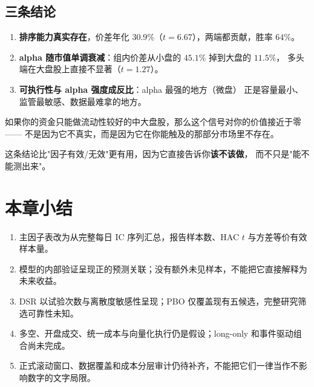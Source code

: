 \subsection{三条结论}

\begin{enumerate}
  \item \textbf{排序能力真实存在}，价差年化 $30.9\%$（$t=6.67$），两端都贡献，胜率 $64\%$。
  \item \textbf{alpha 随市值单调衰减}：组内价差从小盘的 $45.1\%$ 掉到大盘的 $11.5\%$，
        多头端在大盘股上直接不显著（$t=1.27$）。
  \item \textbf{可执行性与 alpha 强度成反比}：alpha 最强的地方（微盘）
        正是容量最小、监管最敏感、数据最难拿的地方。
\end{enumerate}

\begin{keybox}[对个人研究者的含义]
如果你的资金只能做流动性较好的中大盘股，那么这个信号对你的价值接近于零——
不是因为它不真实，而是因为它在你能触及的那部分市场里不存在。

这条结论比"因子有效/无效"更有用，因为它直接告诉你\textbf{该不该做}，
而不只是"能不能测出来"。
\end{keybox}

\section{本章小结}
\begin{enumerate}
  \item 主因子表改为从完整每日 IC 序列汇总，报告样本数、HAC $t$ 与方差等价有效样本量。
  \item 模型的内部验证呈现正的预测关联；没有额外未见样本，不能把它直接解释为未来收益。
  \item DSR 以试验次数与离散度敏感性呈现；PBO 仅覆盖现有五候选，完整研究筛选可靠性未知。
  \item 多空、开盘成交、统一成本与向量化执行仍是假设；long-only 和事件驱动组合尚未完成。
  \item 正式滚动窗口、数据覆盖和成本分层审计仍待补齐，不能把它们一律当作不影响数字的文字局限。
\end{enumerate}
